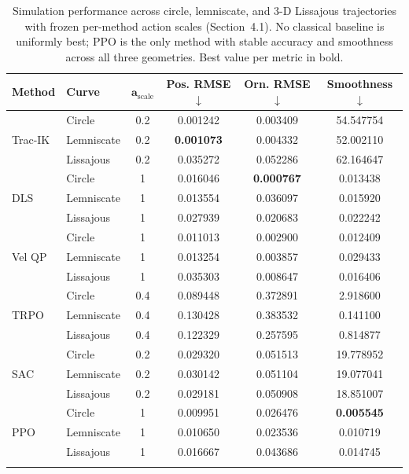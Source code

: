 \documentclass[preprint,12pt]{elsarticle}
\begin{document}
\begin{table}[h]
\centering
\caption{Simulation performance across circle, lemniscate, and 3-D
Lissajous trajectories with frozen per-method action scales
(Section~4.1). No classical baseline is uniformly best; PPO is the only
method with stable accuracy and smoothness across all three geometries.
Best value per metric in bold.}
\label{tab:performance_comparison}
\renewcommand{\arraystretch}{1.0}
\setlength{\tabcolsep}{3pt}
\begin{tabular}{llcccc}
\toprule
\textbf{Method} & \textbf{Curve} & $\mathbf{a_{\mathrm{scale}}}$ & \textbf{Pos. RMSE} $\downarrow$ & \textbf{Orn. RMSE} $\downarrow$ & \textbf{Smoothness} $\downarrow$ \\
\midrule

\multirow{3}{*}{Trac-IK}
& Circle      & 0.2 & 0.001242 & 0.003409 & 54.547754 \\
& Lemniscate  & 0.2 & \textbf{0.001073} & 0.004332 & 52.002110 \\
& Lissajous   & 0.2 & 0.035272 & 0.052286 & 62.164647 \\

\midrule

\multirow{3}{*}{DLS}
& Circle      & 1 & 0.016046 & \textbf{0.000767} & 0.013438 \\
& Lemniscate  & 1 & 0.013554 & 0.036097 & 0.015920 \\
& Lissajous   & 1 & 0.027939 & 0.020683 & 0.022242 \\

\midrule

\multirow{3}{*}{Vel QP}
& Circle      & 1 & 0.011013 & 0.002900 & 0.012409 \\
& Lemniscate  & 1 & 0.013254 & 0.003857 & 0.029433 \\
& Lissajous   & 1 & 0.035303 & 0.008647 & 0.016406 \\

\midrule

\multirow{3}{*}{TRPO}
& Circle      & 0.4 & 0.089448 & 0.372891 & 2.918600 \\
& Lemniscate  & 0.4 & 0.130428 & 0.383532 & 0.141100 \\
& Lissajous   & 0.4 & 0.122329 & 0.257595 & 0.814877 \\

\midrule

\multirow{3}{*}{SAC}
& Circle      & 0.2 & 0.029320 & 0.051513 & 19.778952 \\
& Lemniscate  & 0.2 & 0.030142 & 0.051104 & 19.077041 \\
& Lissajous   & 0.2 & 0.029181 & 0.050908 & 18.851007 \\

\midrule

\multirow{3}{*}{PPO}
& Circle      & 1 & 0.009951 & 0.026476 & \textbf{0.005545} \\
& Lemniscate  & 1 & 0.010650 & 0.023536 & 0.010719 \\
& Lissajous   & 1 & 0.016667 & 0.043686 & 0.014745 \\

\bottomrule
\label{tab:error_metrics_sim}
\end{tabular}
\end{table}
\end{document}
